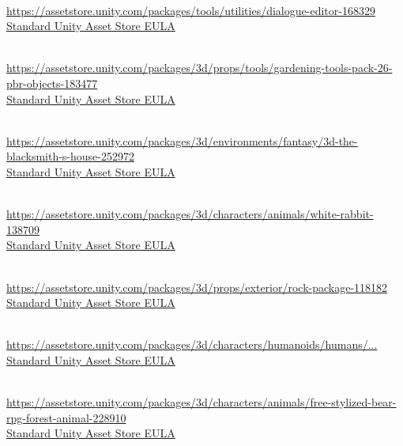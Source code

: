 \begin{description}[]
\item[Dialogue Editor] \hfill \\ \url{https://assetstore.unity.com/packages/tools/utilities/dialogue-editor-168329} \\
  \href{https://unity.com/legal/as-terms}{Standard Unity Asset Store EULA}

\item[Gardening Tools Pack - 26 PBR objects] \hfill \\ \url{https://assetstore.unity.com/packages/3d/props/tools/gardening-tools-pack-26-pbr-objects-183477} \\
  \href{https://unity.com/legal/as-terms}{Standard Unity Asset Store EULA}

\item[3D The Blacksmith's House] \hfill \\ \url{https://assetstore.unity.com/packages/3d/environments/fantasy/3d-the-blacksmith-s-house-252972} \\
  \href{https://unity.com/legal/as-terms}{Standard Unity Asset Store EULA}

\item[White Rabbit] \hfill \\ \url{https://assetstore.unity.com/packages/3d/characters/animals/white-rabbit-138709} \\
  \href{https://unity.com/legal/as-terms}{Standard Unity Asset Store EULA}

\item[Rock package] \hfill \\ \url{https://assetstore.unity.com/packages/3d/props/exterior/rock-package-118182} \\
  \href{https://unity.com/legal/as-terms}{Standard Unity Asset Store EULA}

\item[FREE - Modular Character - Fantasy RPG Human Male] \hfill \\ \href{https://assetstore.unity.com/packages/3d/characters/humanoids/humans/free-modular-character-fantasy-rpg-human-male-228952}{https://assetstore.unity.com/packages/3d/characters/humanoids/humans/...} \\
  \href{https://unity.com/legal/as-terms}{Standard Unity Asset Store EULA}

\item[FREE Stylized Bear - RPG Forest Animal] \hfill \\ \url{https://assetstore.unity.com/packages/3d/characters/animals/free-stylized-bear-rpg-forest-animal-228910} \\
  \href{https://unity.com/legal/as-terms}{Standard Unity Asset Store EULA}


\end{description}
